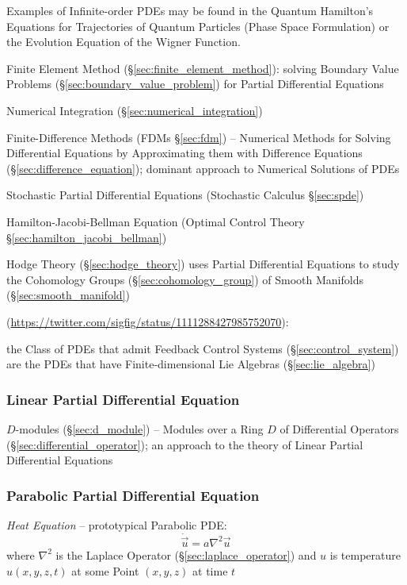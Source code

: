 {Examples of Infinite-order PDEs may be found in the Quantum Hamilton's Equations
for Trajectories of Quantum Particles (Phase Space Formulation) or the Evolution
Equation of the Wigner Function.

Finite Element Method (\S\ref{sec:finite_element_method}): solving Boundary
Value Problems (\S\ref{sec:boundary_value_problem}) for Partial Differential
Equations

\fist Numerical Integration (\S\ref{sec:numerical_integration})

\fist Finite-Difference Methods (FDMs \S\ref{sec:fdm}) -- Numerical Methods for
Solving Differential Equations by Approximating them with Difference Equations
(\S\ref{sec:difference_equation}); dominant approach to Numerical Solutions of
PDEs

\fist Stochastic Partial Differential Equations (Stochastic Calculus
\S\ref{sec:spde})

\fist Hamilton-Jacobi-Bellman Equation (Optimal Control Theory
\S\ref{sec:hamilton_jacobi_bellman})

\fist Hodge Theory (\S\ref{sec:hodge_theory}) uses Partial Differential
Equations to study the Cohomology Groups (\S\ref{sec:cohomology_group}) of
Smooth Manifolds (\S\ref{sec:smooth_manifold})

(\url{https://twitter.com/sigfig/status/1111288427985752070}):

the Class of PDEs that admit Feedback Control Systems
(\S\ref{sec:control_system}) are the PDEs that have Finite-dimensional Lie
Algebras (\S\ref{sec:lie_algebra})



\subsubsection{Linear Partial Differential Equation}\label{sec:linear_pde}

\fist $D$-modules (\S\ref{sec:d_module}) -- Modules over a Ring $D$ of
Differential Operators (\S\ref{sec:differential_operator}); an approach to the
theory of Linear Partial Differential Equations



\subsubsection{Parabolic Partial Differential Equation}\label{sec:parabolic_pde}

\emph{Heat Equation} -- prototypical Parabolic PDE:
\[
  \dot{\vec{u}} = a \nabla^2 \vec{u}
\]
where $\nabla^2$ is the Laplace Operator (\S\ref{sec:laplace_operator}) and $u$
is temperature $u(x,y,z,t)$ at some Point $(x,y,z)$ at time $t$



}
